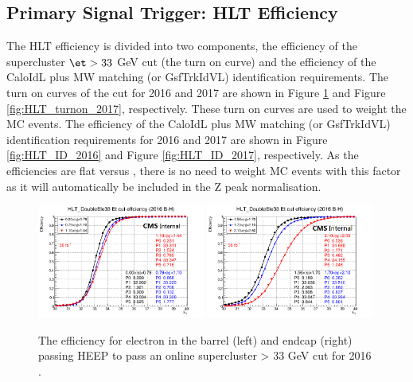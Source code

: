 \subsection{Primary Signal Trigger: HLT Efficiency}\label{sec:HLT_efficiency}
The HLT efficiency is divided into two components, the efficiency of the supercluster $\et>33$ GeV cut (the turn on curve) and the efficiency of the CaloIdL plus MW matching (or GsfTrkIdVL) identification requirements. The turn on curves of the \et cut for 2016 and 2017 are shown in Figure \ref{fig:HLT_turnon_2016} and Figure \ref{fig:HLT_turnon_2017}, respectively. These turn on curves are used to weight the MC events.
The efficiency of the CaloIdL plus MW matching (or GsfTrkIdVL) identification requirements for 2016 and 2017 are shown in Figure \ref{fig:HLT_ID_2016} and Figure \ref{fig:HLT_ID_2017}, respectively. As the efficiencies are flat versus \et, there is no need to weight MC events with this factor as it will automatically be included in the Z peak normalisation.

\begin{figure}[h!]
\begin{center}
\includegraphics[width=0.49\textwidth]{figures/Zprime/2016/trigger/turnOnEEUnseeded.png}
\includegraphics[width=0.49\textwidth]{figures/Zprime/2016/trigger/turnOnEBUnseeded.png}
\caption{The efficiency for electron in the barrel (left) and endcap (right) passing HEEP to pass an online supercluster \et > 33 GeV cut for 2016 \cite{CMS-AN-2016-404}.}
\label{fig:HLT_turnon_2016}
\end{center}
\end{figure}

